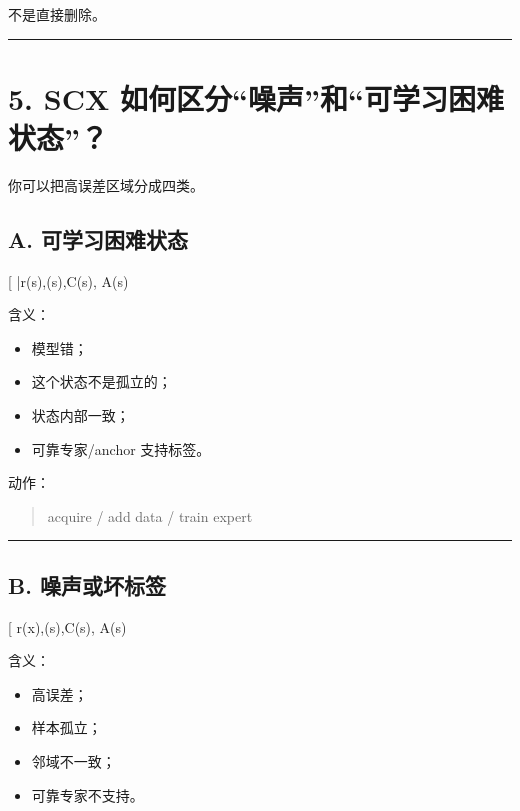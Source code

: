 \documentclass[
  12pt,
]{ctexart}
\providecommand{\tightlist}{%
  \setlength{\itemsep}{0pt}\setlength{\parskip}{0pt}}
\begin{document}
不是直接删除。

\begin{center}\rule{0.5\linewidth}{0.5pt}\end{center}

\section{5. SCX
如何区分``噪声''和``可学习困难状态''？}\label{scx-ux5982ux4f55ux533aux5206ux566aux58f0ux548cux53efux5b66ux4e60ux56f0ux96beux72b6ux6001}

你可以把高误差区域分成四类。

\subsection{A.
可学习困难状态}\label{a.-ux53efux5b66ux4e60ux56f0ux96beux72b6ux6001}

{[} \bar r(s)\uparrow,\quad \rho(s)\uparrow,\quad C(s)\uparrow,\quad
A(s)\uparrow{]}

含义：

\begin{itemize}
\tightlist
\item
  模型错；
\item
  这个状态不是孤立的；
\item
  状态内部一致；
\item
  可靠专家/anchor 支持标签。
\end{itemize}

动作：

\begin{quote}
acquire / add data / train expert
\end{quote}

\begin{center}\rule{0.5\linewidth}{0.5pt}\end{center}

\subsection{B.
噪声或坏标签}\label{b.-ux566aux58f0ux6216ux574fux6807ux7b7e}

{[} r(x)\uparrow,\quad \rho(s)\downarrow,\quad C(s)\downarrow,\quad
A(s)\downarrow{]}

含义：

\begin{itemize}
\tightlist
\item
  高误差；
\item
  样本孤立；
\item
  邻域不一致；
\item
  可靠专家不支持。
\end{itemize}
\end{document}
